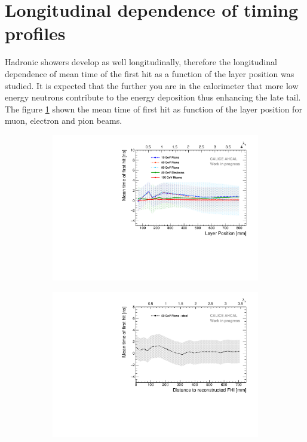 \section{Longitudinal dependence of timing profiles}

Hadronic showers develop as well longitudinally, therefore the longitudinal dependence of mean time of the first hit as a function of the layer position was studied. It is expected that the further you are in the calorimeter that more low energy neutrons contribute to the energy deposition thus enhancing the late tail. The figure \ref{fig:Depth_Comparison} shown the mean time of first hit as function of the layer position for muon, electron and pion beams.

\begin{figure}[htbp!]
	\begin{subfigure}[t]{0.5\textwidth}
		\centering
		\includegraphics[width=1\textwidth]{../Thesis_Plots/Timing/Pions/Plots/Timing_Depth_Comparison_ShortAsymRange.pdf}
		\caption{} \label{fig:Depth_Comparison}
	\end{subfigure}
	\hfill
	\begin{subfigure}[t]{0.5\textwidth}
		\centering
		\includegraphics[width=1\textwidth]{../Thesis_Plots/Timing/Pions/Plots/Timing_Depth_Comparison_ShortAsymRange_ShowerStart.pdf}

\end{subfigure}
\end{figure}
